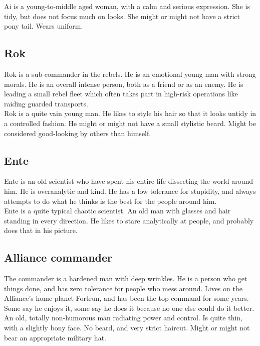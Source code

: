 \documentclass[a4paper,12pt]{article}
\begin{document}
Ai is a young-to-middle aged woman, with a calm and serious expression. She is tidy, but does not
focus much on looks. She might or might not have a strict pony tail. Wears uniform.

\subsection{Rok}

Rok is a sub-commander in the rebels. He is an emotional young man with strong morals. He is an overall
intense person, both as a friend or as an enemy. He is leading a small rebel fleet which often takes part
in high-risk operations like raiding guarded transports.\\

Rok is a quite vain young man. He likes to style his hair so that it looks untidy in a controlled fashion.
He might or might not have a small stylistic beard. Might be considered good-looking by others
than himself.

\subsection{Ente}

Ente is an old scientist who have spent his entire life dissecting the world around him. He is overanalytic
and kind. He has a low tolerance for stupidity, and always attempts to do what he thinks is the best
for the people around him.\\

Ente is a quite typical chaotic scientist. An old man with glasses and hair standing in every direction.
He likes to stare analytically at people, and probably does that in his picture.

\subsection{Alliance commander}

The commander is a hardened man with deep wrinkles. He is a person who get things done, and has
zero tolerance for people who mess around. Lives on the Alliance's home planet Fortrun, and has been
the top command for some years. Some say he enjoys it, some say he does it because no one else could
do it better.\\

An old, totally non-humorous man radiating power and control. Is quite thin, with a slightly bony face.
No beard, and very strict haircut. Might or might not bear an appropriate military hat.
\end{document}
